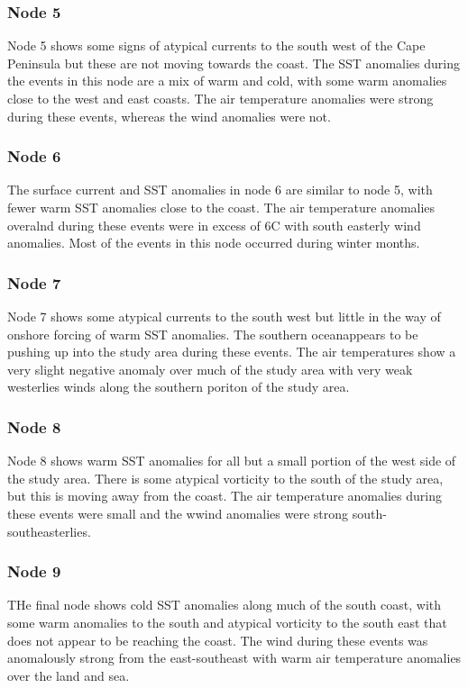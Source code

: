 \documentclass[a4paper,10pt,review]{elsarticle}
\begin{document}
\subsubsection{Node 5}
Node 5 shows some signs of atypical currents to the south west of the Cape Peninsula but these are not moving towards the coast. The SST anomalies during the events in this node are a mix of warm and cold, with some warm anomalies close to the west and east coasts. The air temperature anomalies were strong during these events, whereas the wind anomalies were not.

\subsubsection{Node 6}
The surface current and SST anomalies in node 6 are similar to node 5, with fewer warm SST anomalies close to the coast. The air temperature anomalies overalnd during these events were in excess of 6\degree C with south easterly wind anomalies. Most of the events in this node occurred during winter months.

\subsubsection{Node 7}
Node 7 shows some atypical currents to the south west but little in the way of onshore forcing of warm SST anomalies. The southern oceanappears to be pushing up into the study area during these events. The air temperatures show a very slight negative anomaly over much of the study area with very weak westerlies winds along the southern poriton of the study area.

\subsubsection{Node 8}
Node 8 shows warm SST anomalies for all but a small portion of the west side of the study area. There is some atypical vorticity to the south of the study area, but this is moving away from the coast. The air temperature anomalies during these events were small and the wwind anomalies were strong south-southeasterlies. 

\subsubsection{Node 9}
THe final node shows cold SST anomalies along much of the south coast, with some warm anomalies to the south and atypical vorticity to the south east that does not appear to be reaching the coast. The wind during these events was anomalously strong from the east-southeast with warm air temperature anomalies over the land and sea.
\end{document}
